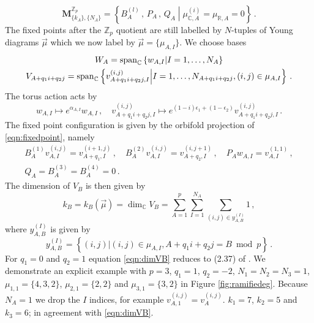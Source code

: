 \documentclass[main.tex]{subfiles}
\begin{document}
\begin{equation}
\mathbf{M}_{\{k_A\},\{N_A\}}^{\mathbb{Z}_p}=\left\{B^{(l)}_A\,,\,P_A\,,\,Q_A\middle|\mu^{(i)}_{\mathbb{C},A}=\mu_{\mathbb{R},A}=0\right\}\,.
\end{equation}
The fixed points after the $\mathbb{Z}_p$ quotient are still labelled by $N$-tuples of Young diagrams $\vec{\mu}$ which we now label by $\vec{\mu}=\{\mu_{A,I}\}$.
We choose bases 
\begin{gather}
W_A=\operatorname{span}_{\mathbb{C}}\left\{w_{A,I}\middle|I=1,\dots,N_A\right\}\\
V_{A+q_{1}i+q_{2}j}=\operatorname{span}_{\mathbb{C}}\left\{v^{(i,j)}_{A+q_{1}i+q_{2}j,I}\middle|I=1,\dots,N_{A+q_{1}i+q_{2}j}, (i,j)\in\mu_{A,I}\right\}\,.
\end{gather}
The torus action acts by
\begin{equation}
w_{A,I}\mapsto e^{\alpha_{A,I}}w_{A,I}\,,\quad v^{(i,j)}_{A+q_{1}i+q_{2}j,I}\mapsto e^{(1-i)\epsilon_1+(1-\epsilon_2)}v^{(i,j)}_{A+q_{1}i+q_{2}j,I}\,.
\end{equation}
The fixed point configuration is given by the orbifold projection of \eqref{eqn:fixedpoint}, namely
\begin{gather}\label{eqn:fixedpointorb}
B^{(1)}_{A}v^{(i,j)}_{A,I}=v^{(i+1,j)}_{A+q_{1},I}\,,\quad B^{(2)}_{A}v^{(i,j)}_{A,I}=v^{(i,j+1)}_{A+q_{2},I}\,,\quad P_Aw_{A,I}=v^{(1,1)}_{A,I}\,,\\ Q_A=B^{(3)}_A=B^{(4)}_A=0\,.
\end{gather}
The dimension of $V_B$ is then given by
\begin{equation}\label{eqn:dimVB}
k_B=k_B(\vec{\mu})=\dim_{\mathbb{C}}V_B=\sum_{A=1}^p \sum_{I=1}^{N_A}\sum_{(i,j)\in y_{A,B}^{(I)}}1\,,
\end{equation}
where $y_{A,B}^{(I)}$ is given by
\begin{equation}
y^{(I)}_{A,B}=\left\{(i,j)|(i,j)\in\mu_{A,I},A+q_{1}i+q_{2}j=B\bmod p\right\}\,.
\end{equation}
For $q_{1}=0$ and $q_{2}=1$ equation \eqref{eqn:dimVB} reduces to (2.37) of \cite{Kanno:2011fw}. We demonstrate an explicit example with $p=3$, $q_{1}=1$, $q_{2}=-2$, $N_1=N_2=N_3=1$, $\mu_{1,1}=\{4,3,2\}$, $\mu_{2,1}=\{2,2\}$ and $\mu_{3,1}=\{3,2\}$ in Figure \ref{fig:ramifiedeg}. Because $N_A=1$ we drop the $I$ indices, for example $v^{(i,j)}_{A,1}=v^{(i,j)}_A$. $k_1=7$, $k_2=5$ and $k_3=6$; in agreement with \eqref{eqn:dimVB}. 
\end{document}
